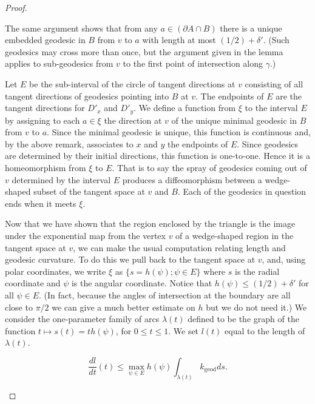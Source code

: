 \begin{proof}
\begin{remark}
\label{rem:focusing-triangle-vertex-geodesic-embedded}
The same argument shows that from any $a\in (\partial A\cap B)$
there is a unique embedded geodesic in $B$ from $v$ to $a$ with
length at most $(1/2)+\delta'$. (Such geodesics may cross more than
once, but the argument given in the lemma applies to sub-geodesics
from $v$ to the first point of intersection along $\gamma$.)
\end{remark}


Let $E$ be the sub-interval of the circle of tangent directions at
$v$ consisting of all tangent directions of geodesics pointing into
$B$ at $v$. The endpoints of $E$ are the tangent directions for
$D'_x$ and $D'_y$. We define a function from $\xi$ to the interval
$E$ by assigning to each $a\in \xi$ the direction at $v$ of the
unique minimal geodesic in $B$ from $v$ to $a$. Since the minimal
geodesic is unique, this function is continuous and, by the above
remark, associates to $x$ and $y$ the endpoints of $E$. Since
geodesics are determined by their initial directions, this function
is one-to-one. Hence it is a homeomorphism from $\xi$ to $E$. That
is to say the spray of geodesics coming out of $v$ determined by the
interval $E$ produces a diffeomorphism between a wedge-shaped subset
of the tangent space at $v$ and $B$. Each of the geodesics in
question ends when it meets $\xi$.


Now that we have shown that the region enclosed by the triangle is
the image under the exponential map from the vertex $v$ of a
wedge-shaped region in the tangent space at $v$, we can make the
usual computation relating length and geodesic curvature. To do this
we pull back to the tangent space at $v$, and, using polar
coordinates, we write $\xi$ as $\{s=h(\psi); \psi\in E\}$ where $s$
is the radial coordinate and $\psi$ is the angular coordinate.
Notice that $h(\psi)\le (1/2)+\delta'$ for all $\psi\in E$. (In
fact, because the angles of intersection at the boundary are all
close to $\pi/2$ we can give a much better estimate on $h$ but we do
not need it.)
 We consider the one-parameter family of arcs $\lambda(t)$ defined
 to be the graph of the function $t\mapsto s(t)=th(\psi)$, for $0\le t\le
 1$. We set $l(t)$ equal to the length of
 $\lambda(t)$.

 \begin{claim}
\label{claim:arc-length-derivative-bound}
$$\frac{dl}{dt}(t)\le \max_{\psi\in E}h(\psi)\int_{\lambda(t)}k_\mathrm{geod}ds.$$
 \end{claim}


\end{proof}
